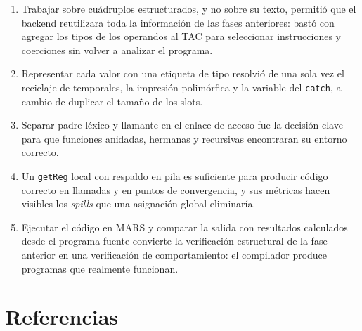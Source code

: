 \documentclass[11pt,a4paper]{article}
\begin{document}
\begin{enumerate}[leftmargin=1.6em]
  \item Trabajar sobre cuádruplos estructurados, y no sobre su texto, permitió
        que el backend reutilizara toda la información de las fases anteriores:
        bastó con agregar los tipos de los operandos al TAC para seleccionar
        instrucciones y coerciones sin volver a analizar el programa.
  \item Representar cada valor con una etiqueta de tipo resolvió de una sola vez
        el reciclaje de temporales, la impresión polimórfica y la variable del
        \texttt{catch}, a cambio de duplicar el tamaño de los slots.
  \item Separar padre léxico y llamante en el enlace de acceso fue la decisión
        clave para que funciones anidadas, hermanas y recursivas encontraran su
        entorno correcto.
  \item Un \texttt{getReg} local con respaldo en pila es suficiente para producir
        código correcto en llamadas y en puntos de convergencia, y sus métricas
        hacen visibles los \emph{spills} que una asignación global eliminaría.
  \item Ejecutar el código en MARS y comparar la salida con resultados calculados
        desde el programa fuente convierte la verificación estructural de la fase
        anterior en una verificación de comportamiento: el compilador produce
        programas que realmente funcionan.
\end{enumerate}

\section{Referencias}
\end{document}
